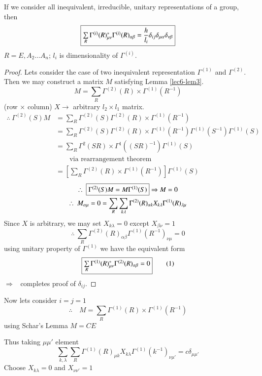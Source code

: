 If we consider all inequivalent, irreducible, unitary representations of a group, then
$$
\fbox{$\sum\limits_{R}\Gamma^{(i)}(R)^{*}_{\mu\nu}\Gamma^{(i)}(R)_{\alpha\beta}=\dfrac{h}{l_{i}}\delta_{ij}\delta_{\mu\alpha}\delta_{\nu\beta}$}
$$
$R=E,A_{2}\ldots A_{n}$; $l_{i}$ is dimensionality of $\Gamma^{(i)}$.

\begin{proof}
Lets consider the case of two inequivalent representation $\Gamma^{(1)}$ and $\Gamma^{(2)}$. Then we may construct a matrix $M$ satisfying Lemma \ref{lec6-lem3}.
$$
M=\sum\limits_{R}\Gamma^{(2)}(R)\times \Gamma^{(1)}(R^{-1})
$$
(row $\times$ column) $X\to$ arbitrary $l_{2}\times l_{1}$ matrix.
\begin{align*}
\therefore \ \Gamma^{(2)}(S)M &= \sum\limits_{R}\Gamma^{(2)}(S)\Gamma^{(2)}(R)\times \Gamma^{(1)}(R^{-1})\\[3pt]
&= \sum\limits_{R}\Gamma^{(2)}(S)\Gamma^{(2)}(R)\times \Gamma^{(1)}(R^{-1})\Gamma^{(1)}(S^{-1})\Gamma^{(1)}(S)\\[3pt]
&= \sum\limits_{R}\Gamma^{2}(SR)\times \Gamma^{1}((SR)^{-1})\Gamma^{(1)}(S)\\
&\qquad \text{via rearrangement theorem}\\
&= \left[\sum\limits_{R}\Gamma^{(2)}(R)\times \Gamma^{(1)}(R^{-1})\right]\Gamma^{(1)}(S)
\end{align*}
\begin{gather*}
\therefore \ \fbox{$\Gamma^{(2)}(S)M=M\Gamma^{(1)}(S)$}\Rightarrow M=0\\
\therefore \ M_{\alpha\mu}=0=\sum\limits_{R}\sum\limits_{k\lambda}\Gamma^{(2)}(R)_{\alpha k}X_{k\lambda}\Gamma^{(1)}(R)_{\lambda \mu}
\end{gather*}
Since $X$ is arbitrary, we may set $X_{k\lambda}=0$ except $X_{\beta \nu}=1$
$$
\therefore \ \sum\limits_{R}\Gamma^{(2)}(R)_{\alpha\beta}\Gamma^{(1)}(R^{-1})_{\nu\mu}=0
$$
using unitary property of $\Gamma^{(1)}$ we have the equivalent form
\begin{equation*}
\fbox{$\sum\limits_{R}\Gamma^{(1)}(R)^{*}_{\mu\nu}\Gamma^{(2)}(R)_{\alpha\beta}=0$}\tag{1}\label{lec6-eq1}
\end{equation*}
$\Rightarrow$ \ completes proof of $\delta_{ij}$.
\end{proof}

Now lets consider $i=j=1$
$$
\therefore\quad M=\sum\limits_{R}\Gamma^{(1)}(R)\times \Gamma^{(1)}(R^{-1})
$$
using Schar's Lemma $M=CE$

Thus taking $\mu\mu'$ element
$$
\sum\limits_{k,\lambda}\sum\limits_{R}\Gamma^{(1)}(R)_{\mu k}X_{k\lambda}\Gamma^{(1)}(k^{-1})_{\nu\mu'}=c\delta_{\mu\mu'}
$$
Choose $X_{k\lambda}=0$ and $X_{\nu\nu'}=1$

